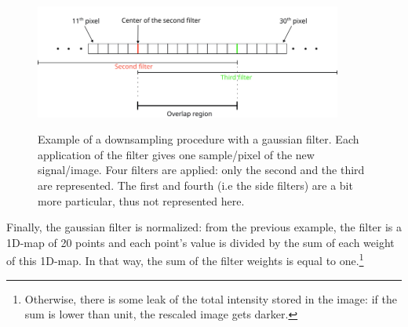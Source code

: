 \documentclass[10pt]{report}
\begin{document}
\begin{figure}[h!]
\caption{Example of a downsampling procedure with a gaussian filter. Each application of the filter gives one sample/pixel of the new signal/image. Four filters are applied: only the second and the third are represented. The first and fourth (i.e the side filters) are a bit more particular, thus not represented here.}
\centering
\includegraphics[width=0.9\textwidth]{dwsmpl-filter}
\label{fig:dwsmpl-filter}
\end{figure}

Finally, the gaussian filter is normalized: from the previous example, the filter is a 1D-map of 20 points and each point's value is divided by the sum of each weight of this 1D-map. In that way, the sum of the filter weights is equal to one.\footnote{Otherwise, there is some leak of the total intensity stored in the image: if the sum is lower than unit, the rescaled image gets darker.}
\end{document}
